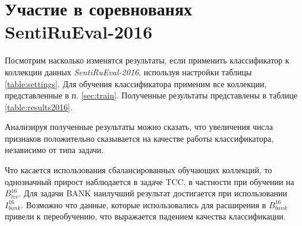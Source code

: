 \section{Участие в соревнованях SentiRuEval-2016}
\label{sec:sentirueval2016}

Посмотрим насколько изменятся результаты, если применить классификатор к
коллекции данных {\it SentiRuEval-2016}, используя настройки таблицы
\ref{table:settings}.
Для обучения классификатора применим все коллекции, представленные в
п. \ref{sec:train}.
Полученные результаты представлены в таблице \ref{table:results2016}.



Анализируя полученные результаты можно сказать, что увеличения числа признаков
положительно сказывается на качестве работы классификатора, независимо от
типа задачи.

Что касается использования сбалансированных обучающих коллекций, то
однозначный прирост наблюдается в задаче TCC, в частности при обучении на
$B_{tcc}^{16}$.
Для задачи BANK наилучший результат достигается при использовании $I_{bank}^{16}$.
Возможно что данные, которые использовались для расширения в $B_{bank}^{16}$
привели к переобучению, что выражается падением качества классификации.
